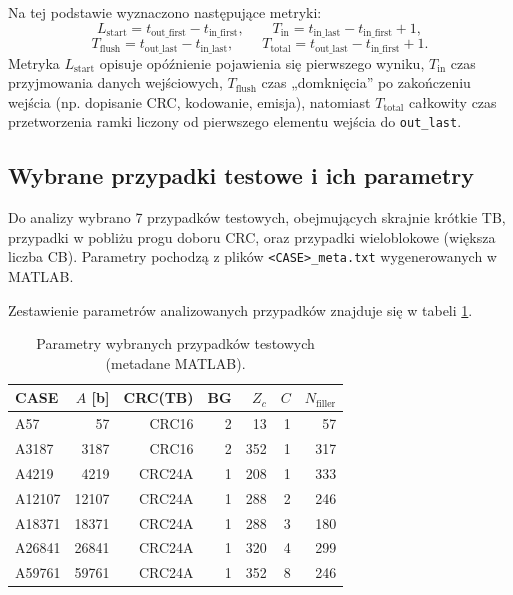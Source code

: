 Na tej podstawie wyznaczono następujące metryki:
\[
L_{\mathrm{start}} = t_{\mathrm{out\_first}} - t_{\mathrm{in\_first}},
\qquad
T_{\mathrm{in}} = t_{\mathrm{in\_last}} - t_{\mathrm{in\_first}} + 1,
\]
\[
T_{\mathrm{flush}} = t_{\mathrm{out\_last}} - t_{\mathrm{in\_last}},
\qquad
T_{\mathrm{total}} = t_{\mathrm{out\_last}} - t_{\mathrm{in\_first}} + 1.
\]
Metryka $L_{\mathrm{start}}$ opisuje opóźnienie pojawienia się pierwszego wyniku, $T_{\mathrm{in}}$ czas przyjmowania danych wejściowych,
$T_{\mathrm{flush}}$ czas „domknięcia” po zakończeniu wejścia (np. dopisanie CRC, kodowanie, emisja), natomiast $T_{\mathrm{total}}$ całkowity czas przetworzenia ramki
liczony od pierwszego elementu wejścia do \texttt{out\_last}.




\subsection{Wybrane przypadki testowe i ich parametry}
\label{subsec:selected_cases_params}

Do analizy wybrano 7 przypadków testowych, obejmujących skrajnie krótkie TB, przypadki w pobliżu progu doboru CRC,
oraz przypadki wieloblokowe (większa liczba CB). Parametry pochodzą z plików \texttt{<CASE>\_meta.txt} wygenerowanych w MATLAB.

Zestawienie parametrów analizowanych przypadków znajduje się w tabeli \ref{tab:selected_cases_params}.

\begin{table}[!ht]
\centering
\caption{Parametry wybranych przypadków testowych (metadane MATLAB).}
\label{tab:selected_cases_params}
\begin{tabular}{lrrrrrr}
\hline
CASE & $A$ [b] & CRC(TB) & BG & $Z_c$ & $C$ & $N_\mathrm{filler}$ \\
\hline
A57     & 57     & CRC16  & 2 & 13  & 1 & 57  \\
A3187   & 3187   & CRC16  & 2 & 352 & 1 & 317 \\
A4219   & 4219   & CRC24A & 1 & 208 & 1 & 333 \\
A12107  & 12107  & CRC24A & 1 & 288 & 2 & 246 \\
A18371  & 18371  & CRC24A & 1 & 288 & 3 & 180 \\
A26841  & 26841  & CRC24A & 1 & 320 & 4 & 299 \\
A59761  & 59761  & CRC24A & 1 & 352 & 8 & 246 \\
\hline
\end{tabular}
\end{table}

